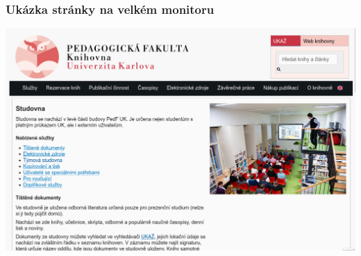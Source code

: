 \begin{frame}
  \frametitle{Ukázka stránky na velkém monitoru}
  \begin{center}
    \includegraphics[height=.9\textheight]{img/pedf-web-big.png}
  \end{center}
\end{frame}

